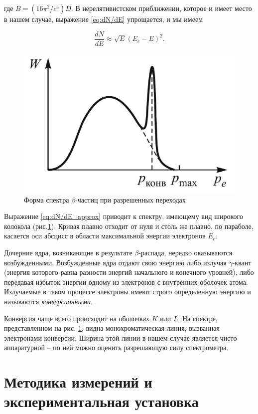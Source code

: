 \documentclass[a4paper, 12pt]{article}
\begin{document}
    где $B = (16\pi^2/c^4)D$. В нерелятивистском приближении, которое и имеет место в нашем случае, выражение \eqref{eq:dN/dE} упрощается, и мы имеем

    \begin{equation}
        \label{eq:dN/dE_approx}
        \dfrac{dN}{dE} \approx \sqrt{E}(E_e - E)^2.
    \end{equation}

    \begin{figure}[H]
        \centering
        \includegraphics[width = 0.5\linewidth]{images/spectrum_th.jpg}
        \caption{Форма спектра $\beta$-частиц при разрешенных переходах}
        \label{fig:spectrum_th}
    \end{figure}

    Выражение \eqref{eq:dN/dE_approx} приводит к спектру, имеющему вид широкого колокола (рис.\ref{fig:spectrum_th}). Кривая плавно отходит от нуля и столь же плавно, по параболе, касается оси абсцисс в области максимальной энергии электронов $E_e$. 

    Дочерние ядра, возникающие в результате $\beta$-распада, нередко оказываются возбужденными. Возбужденные ядра отдают свою энергию либо излучая $\gamma$-квант (энергия которого равна разности энергий начального и конечного уровней), либо передавая избыток энергии одному из электронов с внутренних оболочек атома. Излучаемые в таком процессе электроны имеют строго определенную энергию и называются \textit{конверсионными}.

    Конверсия чаще всего происходит на оболочках $K$ или $L$. На спектре, представленном на рис. \ref{fig:spectrum_th}, видна монохроматическая линия, вызванная электронами конверсии. Ширина этой линии в нашем случае является чисто аппаратурной -- по ней можно оценить разрешающую силу спектрометра.
    
    \newpage
    
    \section{Методика измерений и экспериментальная установка}
\end{document}
